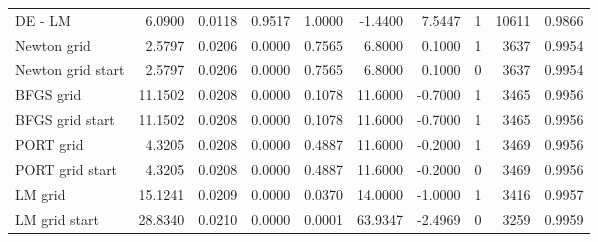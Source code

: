 \begin{tabular}{lrrrrrrrrr}
  \color{red} DE - LM & \color{red} 6.0900 & \color{red} 0.0118 & \color{red} 0.9517 & \color{red} 1.0000 & \color{red} -1.4400 & \color{red} 7.5447 & \color{red} 1 & \color{red} 10611 & \color{red} 0.9866 \\ 
  Newton grid & 2.5797 & 0.0206 & 0.0000 & 0.7565 & 6.8000 & 0.1000 & 1 & 3637 & 0.9954 \\ 
  Newton grid start & 2.5797 & 0.0206 & 0.0000 & 0.7565 & 6.8000 & 0.1000 & 0 & 3637 & 0.9954 \\ 
  BFGS grid & 11.1502 & 0.0208 & 0.0000 & 0.1078 & 11.6000 & -0.7000 & 1 & 3465 & 0.9956 \\ 
  BFGS grid start & 11.1502 & 0.0208 & 0.0000 & 0.1078 & 11.6000 & -0.7000 & 1 & 3465 & 0.9956 \\ 
  PORT grid & 4.3205 & 0.0208 & 0.0000 & 0.4887 & 11.6000 & -0.2000 & 1 & 3469 & 0.9956 \\ 
  PORT grid start & 4.3205 & 0.0208 & 0.0000 & 0.4887 & 11.6000 & -0.2000 & 0 & 3469 & 0.9956 \\ 
  LM grid & 15.1241 & 0.0209 & 0.0000 & 0.0370 & 14.0000 & -1.0000 & 1 & 3416 & 0.9957 \\ 
  \color{red} LM grid start & \color{red} 28.8340 & \color{red} 0.0210 & \color{red} 0.0000 & \color{red} 0.0001 & \color{red} 63.9347 & \color{red} -2.4969 & \color{red} 0 & \color{red} 3259 & \color{red} 0.9959 \\ 
   \hline
\end{tabular}
